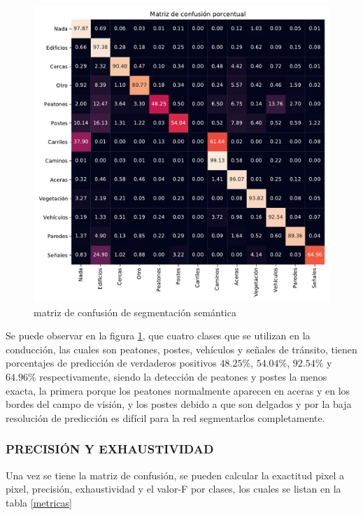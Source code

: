 	\begin{figure}[H]
		\centering
		\includegraphics[scale=0.6]{imagenes/c_mat}
		\caption[Matriz de confusión de segmentación semántica]{matriz de confusión de segmentación semántica}
		\label{confussionmat}
	\end{figure}

	Se puede observar en la figura \ref{confussionmat}, que cuatro clases que se utilizan en la conducción, las cuales son peatones, postes, vehículos y señales de tránsito, tienen porcentajes de predicción de verdaderos positivos $48.25\%$, $54.04\%$, $92.54\%$ y $64.96\%$ respectivamente, siendo la detección de peatones y postes la menos exacta, la primera porque los peatones normalmente aparecen en aceras y en los bordes del campo de visión, y los postes debido a que son delgados y por la baja resolución de predicción es difícil para la red segmentarlos completamente.
	
	\subsubsection{PRECISIÓN Y EXHAUSTIVIDAD}
	Una vez se tiene la matriz de confusión, se pueden calcular la exactitud pixel a pixel, precisión, exhaustividad y el valor-F por clases, los cuales se listan en la tabla \ref{metricas}
	
